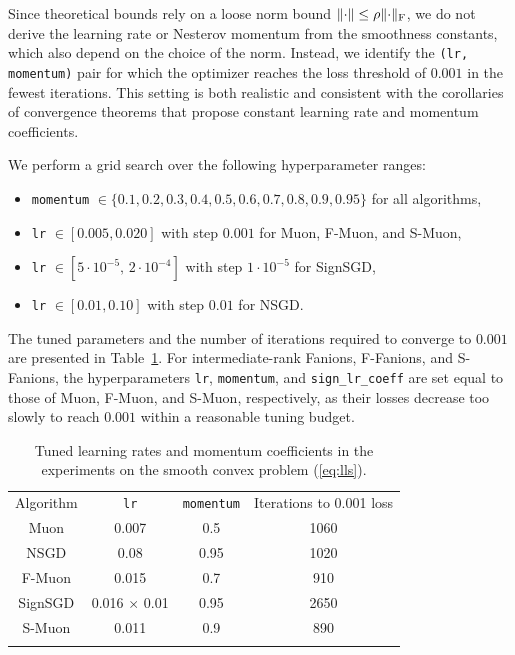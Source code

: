 \documentclass[smallextended,referee,envcountsect]{svjour3}
\newcommand{\norm}[1]{\lVert #1\rVert}
\DeclarePairedDelimiter{\normf}{\|}{\|_\mathrm{F}}
\newcommand{\tableref}[1]{Table~\ref{#1}}
\begin{document}
 Since theoretical bounds \citep{kovalev2025understanding, riabinin2025gluon} rely on a loose norm bound $\norm{\cdot}\le \rho \normf{\cdot}$, we do not derive the learning rate or Nesterov momentum from the smoothness constants, which also depend on the choice of the norm. Instead, we identify the \texttt{(lr, momentum)} pair for which the optimizer reaches the loss threshold of $0.001$ in the fewest iterations. This setting is both realistic and consistent with the corollaries of convergence theorems that propose constant learning rate and momentum coefficients.
 
 We perform a grid search over the following hyperparameter ranges:
 \begin{itemize}
   \item \texttt{momentum} $\in \{0.1, 0.2, 0.3, 0.4, 0.5, 0.6, 0.7, 0.8, 0.9, 0.95\}$ for all algorithms,
   \item \texttt{lr} $\in [0.005, 0.020]$ with step $0.001$ for Muon, F-Muon, and S-Muon,
   \item \texttt{lr} $\in [5 \cdot 10^{-5},\, 2 \cdot 10^{-4}]$ with step $1 \cdot 10^{-5}$ for SignSGD,
   \item \texttt{lr} $\in [0.01, 0.10]$ with step $0.01$ for NSGD.
 \end{itemize}
 The tuned parameters and the number of iterations required to converge to $0.001$ are presented in \tableref{tbl:lls_lrs}. For intermediate-rank Fanions, F-Fanions, and S-Fanions, the hyperparameters \texttt{lr}, \texttt{momentum}, and \texttt{sign\_lr\_coeff} are set equal to those of Muon, F-Muon, and S-Muon, respectively, as their losses decrease too slowly to reach $0.001$ within a reasonable tuning budget.
 
 \begin{table}[htbp]
 
\caption{Tuned learning rates and momentum coefficients in the experiments on the smooth convex problem (\ref{eq:lls}).}\label{tbl:lls_lrs}
%
     \begin{tabular}{cccc}
       \arrayrulecolor{black}\toprule
       Algorithm & \texttt{lr}  & \texttt{momentum}  & Iterations to 0.001 loss \\
       \arrayrulecolor{black}\hline
       Muon & 0.007 & 0.5 & 1060 \\
       \hdashline
       NSGD & 0.08 & 0.95 & 1020 \\
       F-Muon & 0.015 & 0.7 & 910 \\
       \hdashline
       SignSGD & 0.016 $\times$ 0.01 & 0.95 & 2650 \\
       S-Muon & 0.011 & 0.9 & 890 \\
       \arrayrulecolor{black}\bottomrule
     \end{tabular}%
   

 \end{table}
 
\end{document}
